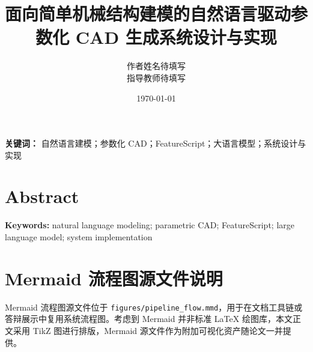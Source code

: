 \documentclass[UTF8,a4paper,12pt]{ctexart}
\title{\heiti 面向简单机械结构建模的自然语言驱动参数化 CAD 生成系统设计与实现}
\author{作者姓名待填写 \\ 指导教师待填写}
\date{\today}
\begin{document}
\maketitle

\begin{abstract}

\end{abstract}
\noindent\textbf{关键词：} 自然语言建模；参数化 CAD；FeatureScript；大语言模型；系统设计与实现

\section*{Abstract}

\noindent\textbf{Keywords:} natural language modeling; parametric CAD; FeatureScript; large language model; system implementation

\tableofcontents
\newpage









\appendix
\section{Mermaid 流程图源文件说明}
Mermaid 流程图源文件位于 \texttt{figures/pipeline\_flow.mmd}，用于在文档工具链或答辩展示中复用系统流程图。考虑到 Mermaid 并非标准 LaTeX 绘图库，本文正文采用 TikZ 图进行排版，Mermaid 源文件作为附加可视化资产随论文一并提供。
\end{document}
